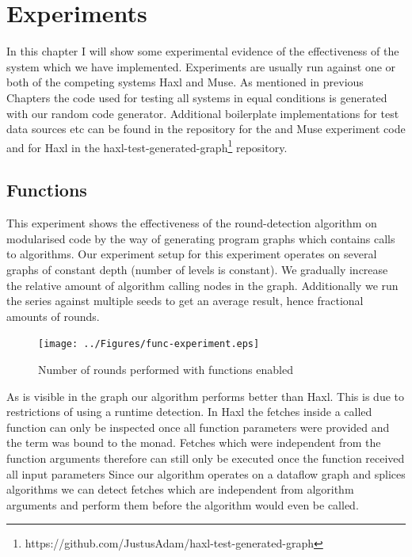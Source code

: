 \chapter{Experiments}

\label{ch:Experiments}

In this chapter I will show some experimental evidence of the effectiveness of the system which we have implemented.
Experiments are usually run against one or both of the competing systems Haxl\cite{Haxl:library:link} and Muse\cite{Muse:repository:link}.
As mentioned in previous Chapters the code used for testing all systems in equal conditions is generated with our random code generator\cite{Goens-rand-code-graph}.
Additional boilerplate implementations for test data sources etc can be found in the \yauhau{} repository\cite{Yauhau:repository:link} for the \yauhau{} and Muse experiment code and for Haxl in the haxl-test-generated-graph\footnote{https://github.com/JustusAdam/haxl-test-generated-graph} repository.

\section{Functions}

This experiment shows the effectiveness of the round-detection algorithm on modularised code by the way of generating program graphs which contains calls to algorithms.
Our experiment setup for this experiment operates on several graphs of constant depth (number of levels is constant).
We gradually increase the relative amount of algorithm calling nodes in the graph.
Additionally we run the series against multiple seeds to get an average result, hence fractional amounts of rounds.

\begin{figure}
    \texttt{[image: ../Figures/func-experiment.eps]}
    \caption{Number of rounds performed with functions enabled}
\end{figure}

As is visible in the graph our algorithm performs better than Haxl.
This is due to restrictions of using a runtime detection.
In Haxl the fetches inside a called function can only be inspected once all function parameters were provided and the term was bound to the monad.
Fetches which were independent from the function arguments therefore can still only be executed once the function received all input parameters
Since our algorithm operates on a dataflow graph and splices algorithms we can detect fetches which are independent from algorithm arguments and perform them before the algorithm would even be called.

